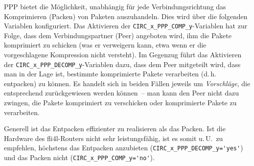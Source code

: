 PPP bietet die Möglichkeit, unabhängig für jede Verbindungsrichtung das
Komprimieren (Packen) von Paketen auszuhandeln. Dies wird über die folgenden
Variablen konfiguriert. Das Aktivieren der \verb+CIRC_x_PPP_COMP_y+-Variablen
hat zur Folge, dass dem Verbindungspartner (Peer) angeboten wird, ihm die Pakete
komprimiert zu schicken (was er verweigern kann, etwa wenn er die vorgeschlagene
Kompression nicht versteht). Im Gegenzug führt das Aktivieren der
\verb+CIRC_x_PPP_DECOMP_y+-Variablen dazu, dass dem Peer mitgeteilt wird, dass
man in der Lage ist, bestimmte komprimierte Pakete verarbeiten (d.\,h.
entpacken) zu können. Es handelt sich in beiden Fällen jeweils um
\emph{Vorschläge}, die entsprechend zurückgewiesen werden können~-- man kann
den Peer nicht dazu zwingen, die Pakete komprimiert zu verschicken oder
komprimierte Pakete zu verarbeiten.

Generell ist das Entpacken effizienter zu realisieren als das Packen. Ist die
Hardware des fli4l-Routers nicht sehr leistungsfähig, ist es somit u.\,U.\ zu
empfehlen, höchstens das Entpacken anzubieten (\verb+CIRC_x_PPP_DECOMP_y='yes'+)
und das Packen nicht (\verb+CIRC_x_PPP_COMP_y='no'+).

